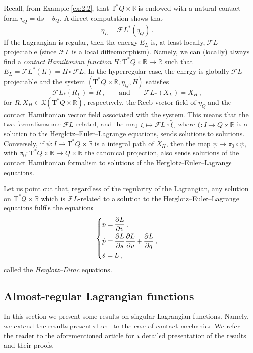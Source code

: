 \documentclass[11pt]{article}
\theoremstyle{plain}
\theoremstyle{definition}
\newcommand{\R}{\mathbb{R}}
\renewcommand{\d}{\mathrm{d}}
\newcommand{\T}{{\mathrm T}}
\let\Tan\T
\newcommand{\X}{\mathfrak{X}}
\newcommand{\parder}[2]{\frac{\partial #1}{\partial #2}}
\def\d{\mathrm{d}}
\def\X{\mathfrak{X}}
\def\d{\mathrm{d}}
\def\Tan{\mathrm{T}}
\def\FL{\mathcal{F} L}
\begin{document}
Recall, from Example \ref{ex:2.2}, that $\Tan^* Q \times \R$ is endowed with a natural contact form $\eta_Q = \d s - \theta_Q$.
A direct computation shows that
$$ \eta_L = \FL ^* (\eta_Q)\,. $$
If the Lagrangian is regular, then the energy $E_L$ is, at least locally, $\FL$-projectable (since $\FL$ is a local diffeomorphism). Namely, we can (locally) always find a \textsl{contact Hamiltonian function} $H\colon \Tan ^* Q \times \R \to \R$ such that
$E_L = \FL^*(H) = H\circ\FL$.
In the hyperregular case, the energy is globally $\FL$-projectable and the system $(\Tan^* Q\times \R , \eta_Q, H)$ satisfies
$$\FL_* (R_L) = R\,, \qquad \text{and} \qquad \FL_* (X_L)=X_H\,,$$
for $R,X_H \in \X (\Tan^* Q \times \R)$, respectively, the Reeb vector field of $\eta_Q$ and the contact Hamiltonian vector field associated with the system. This means that the two formalisms are $\FL$-related, and the map $\xi \mapsto \FL \circ \widetilde \xi$, where $\xi \colon I \to Q \times \R$ is a solution to the Herglotz--Euler--Lagrange equations, sends solutions to solutions. Conversely, if $\psi \colon I \to \Tan^* Q \times \R$ is a integral path of $X_H$, then the map $\psi \mapsto \pi_0 \circ \psi$, with $\pi_0 \colon \Tan^* Q \times \R \to Q\times \R$ the canonical projection, also sends solutions of the contact Hamiltonian formalism to solutions of the Herglotz--Euler--Lagrange equations.

Let us point out that, regardless of the regularity of the Lagrangian, any solution on $\Tan^* Q \times \R$ which is $\FL$-related to a solution to the Herglotz--Euler--Lagrange equations fulfils the equations
\begin{equation}\label{Herglotz--Dirac_eq}
    \begin{dcases}
    p= \parder{L}{v}\,,
    \\
    \dot p = \parder{L}{s}\parder{L}{v} + \parder{L}{q}\,,
    \\
        \dot s = L\,,
    \end{dcases}
\end{equation}
called the \textsl{Herglotz--Dirac} equations.


\subsection{Almost-regular Lagrangian functions}
\label{sec:almost_regular}
In this section we present some results on singular Lagrangian functions. Namely, we extend the results presented on~\cite{GraPon_2001} to the case of contact mechanics. We refer the reader to the aforementioned article for a detailed presentation of the 
results and their proofs.
\end{document}
